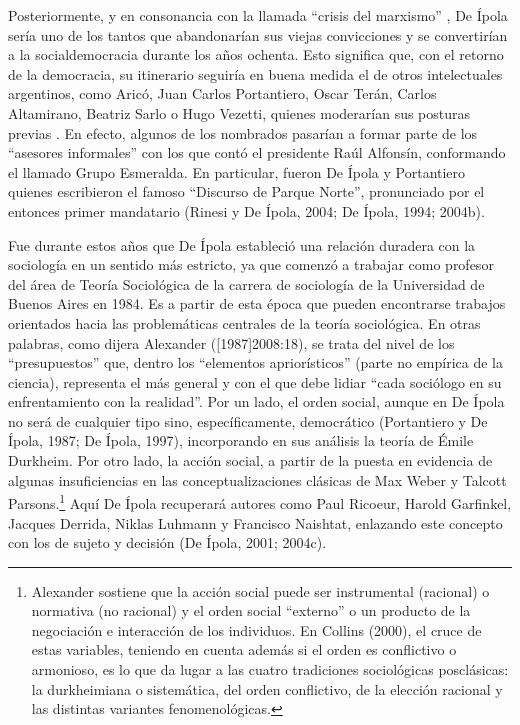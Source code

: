 Posteriormente, y en consonancia con la llamada ``crisis del marxismo'' \parencite{279-ANDERSON2011}, De Ípola sería uno de los tantos que abandonarían sus viejas convicciones y se convertirían a la socialdemocracia durante los años ochenta. Esto significa que, con el retorno de la democracia, su itinerario seguiría en buena medida el de otros intelectuales argentinos, como Aricó, Juan Carlos Portantiero, Oscar Terán, Carlos Altamirano, Beatriz Sarlo o Hugo Vezetti, quienes moderarían sus posturas previas \parencite{1446-BURGOS2004}. En efecto, algunos de los nombrados pasarían a formar parte de los ``asesores informales'' con los que contó el presidente Raúl Alfonsín, conformando el llamado Grupo Esmeralda. En particular, fueron De Ípola y Portantiero quienes escribieron el famoso ``Discurso de Parque Norte'', pronunciado por el entonces primer mandatario (Rinesi y De Ípola, 2004; De Ípola, 1994; 2004b).

Fue durante estos años que De Ípola estableció una relación duradera con la sociología en un sentido más estricto, ya que comenzó a trabajar como profesor del área de Teoría Sociológica de la carrera de sociología de la Universidad de Buenos Aires en 1984. Es a partir de esta época que pueden encontrarse trabajos orientados hacia las problemáticas centrales de la teoría sociológica. En otras palabras, como dijera Alexander ([1987]2008:18), se trata del nivel de los ``presupuestos'' que, dentro los ``elementos apriorísticos'' (parte no empírica de la ciencia), representa el más general y con el que debe lidiar ``cada sociólogo en su enfrentamiento con la realidad''. Por un lado, el orden social, aunque en De Ípola no será de cualquier tipo sino, específicamente, democrático (Portantiero y De Ípola, 1987; De Ípola, 1997), incorporando en sus análisis la teoría de Émile Durkheim. Por otro lado, la acción social, a partir de la puesta en evidencia de algunas insuficiencias en las conceptualizaciones clásicas de Max Weber y Talcott Parsons.\footnote{Alexander sostiene que la acción social puede ser instrumental (racional) o normativa (no racional) y el orden social ``externo'' o un producto de la negociación e interacción de los individuos. En Collins (2000), el cruce de estas variables, teniendo en cuenta además si el orden es conflictivo o armonioso, es lo que da lugar a las cuatro tradiciones sociológicas posclásicas: la durkheimiana o sistemática, del orden conflictivo, de la elección racional y las distintas variantes fenomenológicas.} Aquí De Ípola recuperará autores como Paul Ricoeur, Harold Garfinkel, Jacques Derrida, Niklas Luhmann y Francisco Naishtat, enlazando este concepto con los de sujeto y decisión (De Ípola, 2001; 2004c).

